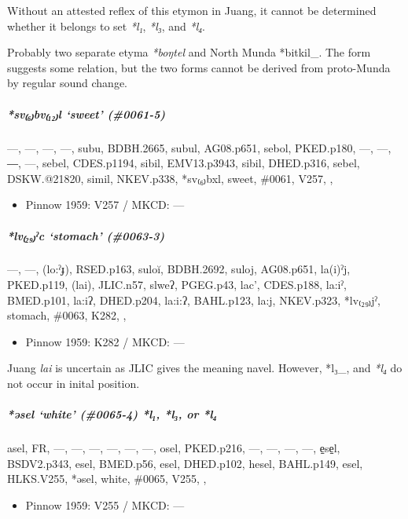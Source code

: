 \documentclass[a4paper,]{article}
\providecommand{\tightlist}{%
  \setlength{\itemsep}{0pt}\setlength{\parskip}{0pt}}
\let\oldsubparagraph\subparagraph
\renewcommand{\subparagraph}[1]{\oldsubparagraph{#1}\mbox{}}
\begin{document}
Without an attested reflex of this etymon in Juang, it cannot be
determined whether it belongs to set \emph{*l₁}, \emph{*l₃}, and
\emph{*l₄}.

Probably two separate etyma \emph{*boŋtel} and North Munda *bitkil\_.
The form suggests some relation, but the two forms cannot be derived
from proto-Munda by regular sound change.

\subparagraph{\texorpdfstring{\emph{*sv₍₆₎bv₍₁₂₎l} `sweet'
(\#0061-5)}{*sv₍₆₎bv₍₁₂₎l sweet (\#0061-5)}}\label{svbvl-sweet-0061-5}

---, ---, ---, ---, subu, BDBH.2665, subul, AG08.p651, sebol, PKED.p180,
---, ---, ―, ---, sebel, CDES.p1194, sibil, EMV13.p3943, sibil,
DHED.p316, sebel, DSKW.@21820, simil, NKEV.p338, *sv₍₆₎bxl, sweet,
\#0061, V257, ,

\begin{itemize}
\tightlist
\item
  Pinnow 1959: V257 / MKCD: ---
\end{itemize}

\subparagraph{\texorpdfstring{\emph{*lv₍₂₉₎ˀc} `stomach'
(\#0063-3)}{*lv₍₂₉₎ˀc stomach (\#0063-3)}}\label{lvux2c0c-stomach-0063-3-1}

---, ---, (lo:ˀɟ), RSED.p163, suloĭ, BDBH.2692, suloj, AG08.p651,
la(i)ˀj, PKED.p119, (lai), JLIC.n57, slweʔ, PGEG.p43, lac', CDES.p188,
la:iˀ, BMED.p101, la:iʔ, DHED.p204, la:i:ʔ, BAHL.p123, la:j, NKEV.p323,
*lv₍₂₉₎jˀ, stomach, \#0063, K282, ,

\begin{itemize}
\tightlist
\item
  Pinnow 1959: K282 / MKCD: ---
\end{itemize}

Juang \emph{lai} is uncertain as JLIC gives the meaning navel. However,
*l₃\_, and \emph{*l₄} do not occur in inital position.

\subparagraph{\texorpdfstring{\emph{*əsel} `white' (\#0065-4)
\emph{*l₁}, \emph{*l₃}, or
\emph{*l₄}}{*əsel white (\#0065-4) *l₁, *l₃, or *l₄}}\label{ux259sel-white-0065-4-l-l-or-l}

asel, FR, ---, ---, ---, ---, ---, ---, osel, PKED.p216, ---, ---, ---,
---, e̠se̠l, BSDV2.p343, esel, BMED.p56, esel, DHED.p102, hesel,
BAHL.p149, esel, HLKS.V255, *əsel, white, \#0065, V255, ,

\begin{itemize}
\tightlist
\item
  Pinnow 1959: V255 / MKCD: ---
\end{itemize}
\end{document}
